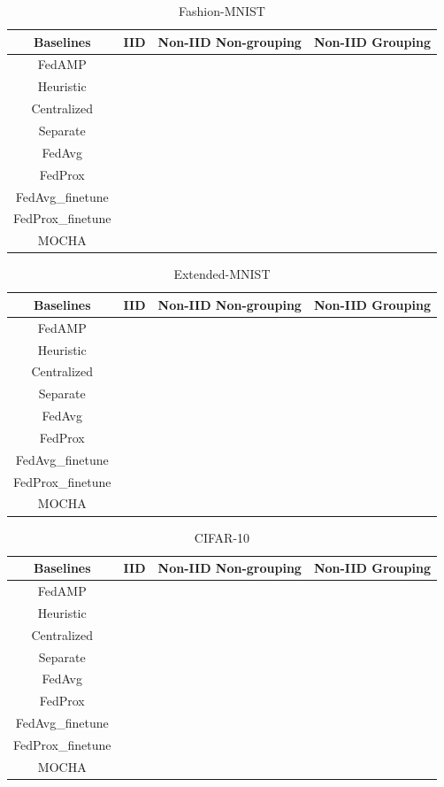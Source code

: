 {\begin{table}[h!]
\centering
\begin{tabular}{ |c|c c c| } 
 \hline
 Baselines & IID & Non-IID Non-grouping & Non-IID Grouping \\ 
 \hline
 FedAMP &  &  &  \\ 
 Heuristic &  &  & \\ 
 Centralized &  &  & \\
 Separate &  &  & \\
 FedAvg &  &  & \\
 FedProx &  &  & \\
 FedAvg\_finetune &  &  & \\
 FedProx\_finetune &  &  & \\
 MOCHA &  &  & \\
 \hline
\end{tabular}
\caption{Fashion-MNIST}
\end{table}

\begin{table}[h!]
\centering
\begin{tabular}{ |c|c c c| } 
 \hline
 Baselines & IID & Non-IID Non-grouping & Non-IID Grouping \\ 
 \hline
 FedAMP &  &  &  \\ 
 Heuristic &  &  & \\ 
 Centralized &  &  & \\
 Separate &  &  & \\
 FedAvg &  &  & \\
 FedProx &  &  & \\
 FedAvg\_finetune &  &  & \\
 FedProx\_finetune &  &  & \\
 MOCHA &  &  & \\
 \hline
\end{tabular}
\caption{Extended-MNIST}
\end{table}

\begin{table}[h!]
\centering
\begin{tabular}{ |c|c c c| } 
 \hline
 Baselines & IID & Non-IID Non-grouping & Non-IID Grouping \\ 
 \hline
 FedAMP &  &  &  \\ 
 Heuristic &  &  & \\ 
 Centralized &  &  & \\
 Separate &  &  & \\
 FedAvg &  &  & \\
 FedProx &  &  & \\
 FedAvg\_finetune &  &  & \\
 FedProx\_finetune &  &  & \\
 MOCHA &  &  & \\
 \hline
\end{tabular}
\caption{CIFAR-10}
\end{table}
}

